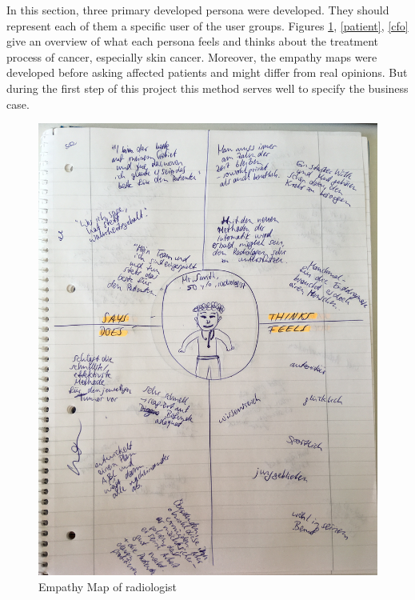 In this section, three primary developed persona were developed. They should represent each of them a specific user of the user groups. Figures \ref{radiologist}, \ref{patient}, \ref{cfo} give an overview of what each persona feels and thinks about the treatment process of cancer, especially skin cancer. Moreover, the empathy maps were developed before asking affected patients and might differ from real opinions. But during the first step of this project this method serves well to specify the business case. 

\begin{figure}[h!]
	\centering
	\includegraphics[width=1\textwidth]{images/empathymap_radiologist.jpg}
	\caption{Empathy Map of radiologist}
	\label{radiologist}
\end{figure}

